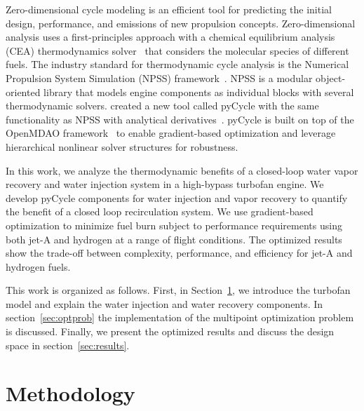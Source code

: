 \documentclass[conf]{new-aiaa}
\begin{document}
Zero-dimensional cycle modeling is an efficient tool for predicting the initial design, performance, and emissions of new propulsion concepts.
Zero-dimensional analysis uses a first-principles approach with a chemical equilibrium analysis (CEA) thermodynamics solver~\cite{Gordon1994} that considers the molecular species of different fuels.
The industry standard for thermodynamic cycle analysis is the Numerical Propulsion System Simulation (NPSS) framework~\cite{JonesNPSS}.
NPSS is a modular object-oriented library that models engine components as individual blocks with several thermodynamic solvers.
\citet{Hendricks2019} created a new tool called pyCycle with the same functionality as NPSS with analytical derivatives~\cite{Gray2017b}.
pyCycle is built on top of the OpenMDAO framework~\cite{Gray2019a} to enable gradient-based optimization and leverage hierarchical nonlinear solver structures for robustness.

In this work, we analyze the thermodynamic benefits of a closed-loop water vapor recovery and water injection system in a high-bypass turbofan engine.
We develop pyCycle components for water injection and vapor recovery to quantify the benefit of a closed loop recirculation system.
We use gradient-based optimization to minimize fuel burn subject to performance requirements using both jet-A and hydrogen at a range of flight conditions.
The optimized results show the trade-off between complexity, performance, and efficiency for jet-A and hydrogen fuels.

This work is organized as follows. First, in Section~\ref{sec:method}, we introduce the turbofan model and explain the water injection and water recovery components.
In section~\ref{sec:optprob} the implementation of the multipoint optimization problem is discussed.
Finally, we present the optimized results and discuss the design space in section~\ref{sec:results}.

\section{Methodology}
\label{sec:method}
\end{document}
